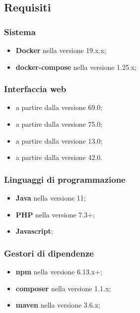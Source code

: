 \subsection{Requisiti}
	\subsubsection{Sistema}
	\begin{itemize}
		\item \textbf{Docker} nella versione 19.x.x;
		\item \textbf{docker-compose} nella versione 1.25.x;
	\end{itemize}
	\subsubsection{Interfaccia web}
		\begin{itemize}
		 	\item {} a partire dalla versione 69.0;
		 	\item {} a partire dalla versione 75.0;
		 	\item {} a partire dalla versione 13.0;
		 	\item {} a partire dalla versione 42.0.
		\end{itemize} 
	\subsubsection{Linguaggi di programmazione}
		\begin{itemize}
			\item \textbf{Java} nella versione 11;
			\item \textbf{PHP} nella versione 7.3+;
			\item \textbf{Javascript};
		\end{itemize}
	\subsubsection{Gestori di dipendenze}
		\begin{itemize}
			\item \textbf{npm} nella versione 6.13.x+;
			\item \textbf{composer} nella versione 1.1.x;
			\item \textbf{maven} nella versione 3.6.x; 
		\end{itemize}
